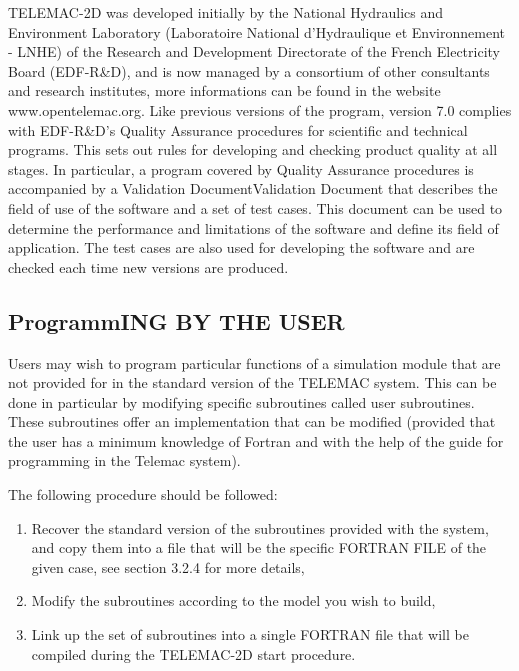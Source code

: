 \documentclass{article} %
\begin{document}
 TELEMAC-2D was developed initially by the National Hydraulics and Environment Laboratory (Laboratoire National d'Hydraulique et Environnement - LNHE) of the Research and Development Directorate of the French Electricity Board (EDF-R\&D), and is now managed by a consortium of other consultants and research institutes, more informations can be found in the website www.opentelemac.org. Like previous versions of the program, version 7.0 complies with EDF-R\&D's Quality Assurance procedures for scientific and technical programs. This sets out rules for developing and checking product quality at all stages. In particular, a program covered by Quality Assurance procedures is accompanied by a Validation DocumentValidation Document  that describes the field of use of the software and a set of test cases. This document can be used to determine the performance and limitations of the software and define its field of application. The test cases are also used for developing the software and are checked each time new versions are produced.


\subsection{  ProgrammING BY THE USER}

 Users may wish to program particular functions of a simulation module that are not provided for in the standard version of the TELEMAC system. This can be done in particular by modifying specific subroutines called user subroutines. These subroutines offer an implementation that can be modified (provided that the user has a minimum knowledge of Fortran and with the help of the guide for programming in the Telemac system).

 The following procedure should be followed:

\begin{enumerate}
\item  Recover the standard version of the subroutines provided with the system, and copy them into a file that will be the specific FORTRAN FILE of the given case, see section 3.2.4 for more details,

\item  Modify the subroutines according to the model you wish to build,

\item  Link up the set of subroutines into a single FORTRAN file that will be compiled during the TELEMAC-2D start procedure.
\end{enumerate}
\end{document}

